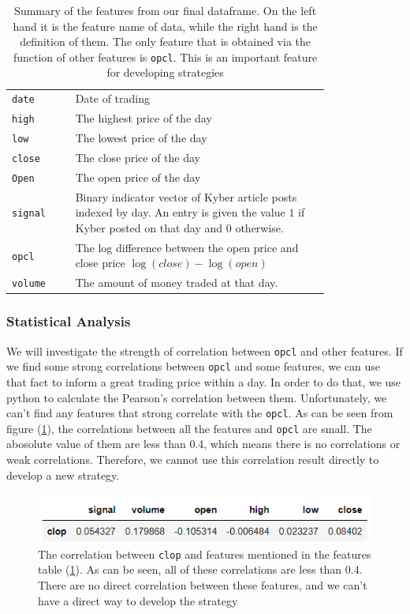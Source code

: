 \documentclass[twoside]{report}
\newcommand{\code}{\texttt}
\begin{document}
\begin{spacing}{1}
\begin{table}[!htp]
    \centering
    \begin{tabular}{|l|p{0.8\linewidth}|}
        \hline
        \code{date}  & Date of trading \\
        \code{high} & The highest price of the day\\
       \code{low}& The lowest price of the day\\
       \code{close} & The close price of the day\\
       \code{Open}& The open price of the day\\
         \code{signal} & Binary indicator vector of Kyber article posts indexed by day. An entry is given the value $1$ if Kyber posted on that day and $0$ otherwise.\\
         \code{opcl}  & The log difference between the open price and close price \code{$\log(close)-\log(open)$} \\
        \code{volume} & The amount of money traded at that day.\\ \hline
    \end{tabular}\vspace{2mm}
    \caption{Summary of the features from our final dataframe. On the left hand it is the feature name of data, while the right hand is the definition of them. The only feature that is obtained via the function of other features is \code{opcl}. This is an important feature for developing strategies }
    \label{tab:feature}
\end{table}


\subsubsection{Statistical Analysis}
We will investigate the strength of correlation between \code{opcl} and other features. If we find some strong correlations between \code{opcl} and some features, we can use that fact to inform a great trading price within a day. In order to do that, we use python to calculate the Pearson's correlation between them. Unfortunately, we can't find any features that strong correlate with the \code{opcl}. As can be seen from figure (\ref{medium stats}), the correlations between all the features and \code{opcl} are small. The abosolute value of them are less than 0.4, which means there is no correlations or weak correlations. Therefore, we cannot use this correlation result directly to develop a new strategy.

\begin{figure}[!htbp]
    \centering
    \includegraphics{Images/Medium stats.png}
    \caption{The correlation between \code{clop} and features mentioned in the features table (\ref{tab:feature}). As can be seen, all of these correlations are less than 0.4. There are no direct correlation between these features, and we can't have a direct way to develop the strategy}
    \label{medium stats}
\end{figure}



\end{spacing}
\end{document}
